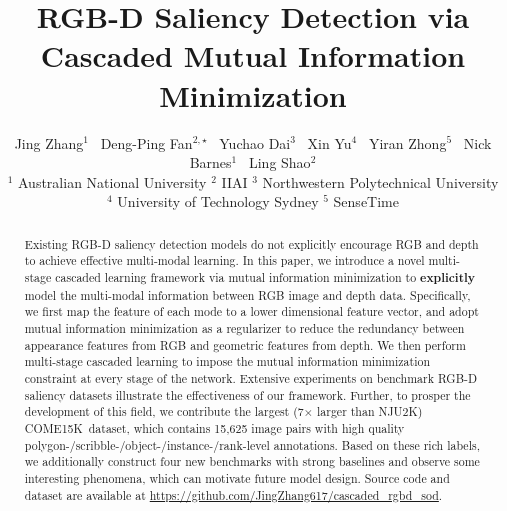 \documentclass[10pt,twocolumn,letterpaper]{article}
\def\ourdataset{COME15K}
\begin{document}
\title{RGB-D Saliency Detection via Cascaded Mutual Information Minimization}

\author{
Jing Zhang$^{1}$~
Deng-Ping Fan$^{2,\star}$~
Yuchao Dai$^{3}$~
Xin Yu$^{4}$~ 
Yiran Zhong$^{5}$~ 
Nick Barnes$^{1}$~ 
Ling Shao$^{2}$\\
$^1$ Australian National University\quad
$^2$ IIAI\quad
$^3$ Northwestern Polytechnical University\\
$^4$ University of Technology Sydney\quad
$^5$ SenseTime\\
}

\maketitle
\ificcvfinal\thispagestyle{empty}\fi

\begin{abstract}
Existing RGB-D saliency detection models do not explicitly encourage RGB and depth to achieve effective multi-modal learning. In this paper, we introduce a novel multi-stage cascaded learning framework via mutual information minimization to \textbf{explicitly} model the multi-modal information between RGB image and depth data. Specifically, we first map the feature of each mode to a lower dimensional feature vector, and adopt mutual information minimization as a regularizer to reduce the redundancy between appearance features from RGB and geometric features from depth. We then perform multi-stage cascaded learning to impose the mutual information minimization constraint at every stage of the network. Extensive experiments on benchmark RGB-D saliency datasets illustrate the effectiveness of our framework. Further, to prosper the development of this field, 
we contribute the largest (7$\times$ larger than NJU2K) \ourdataset~dataset, which contains 15,625 image pairs with
high quality polygon-/scribble-/object-/instance-/rank-level annotations. Based on these rich labels, we additionally construct four new benchmarks
with strong baselines and observe some interesting phenomena, which can motivate future model design. Source code and dataset are available at \url{https://github.com/JingZhang617/cascaded_rgbd_sod}.
\end{abstract}
\end{document}
